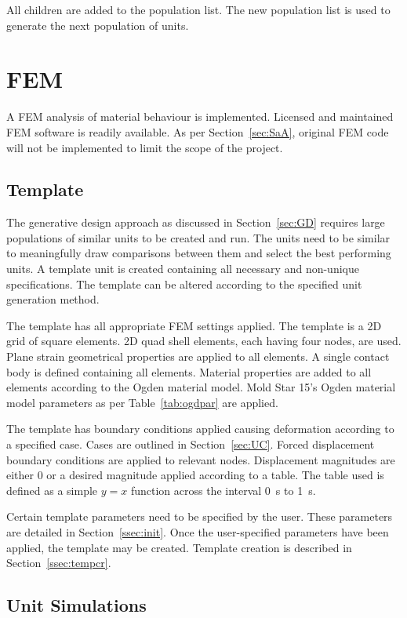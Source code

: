 All children are added to the population list. The new population list is used to generate the next population of units.

\section{FEM}

A FEM analysis of material behaviour is implemented. Licensed and maintained FEM software is readily available. As per Section~\ref{sec:SaA}, original FEM code will not be implemented to limit the scope of the project.

\subsection{Template}

The generative design approach as discussed in Section~\ref{sec:GD} requires large populations of similar units to be created and run. The units need to be similar to meaningfully draw comparisons between them and select the best performing units. A template unit is created containing all necessary and non-unique specifications. The template can be altered according to the specified unit generation method.

The template has all appropriate FEM settings applied. The template is a 2D grid of square elements. 2D quad shell elements, each having four nodes, are used. Plane strain geometrical properties are applied to all elements. A single contact body is defined containing all elements. Material properties are added to all elements according to the Ogden material model. Mold Star 15's Ogden material model parameters as per Table~\ref{tab:ogdpar} are applied.

The template has boundary conditions applied causing deformation according to a specified case. Cases are outlined in Section~\ref{sec:UC}. Forced displacement boundary conditions are applied to relevant nodes. Displacement magnitudes are either 0 or a desired magnitude applied according to a table. The table used is defined as a simple $y=x$ function across the interval \SI{0}{\second} to \SI{1}{\second}.

Certain template parameters need to be specified by the user. These parameters are detailed in Section~\ref{ssec:init}. Once the user-specified parameters have been applied, the template may be created. Template creation is described in Section~\ref{ssec:tempcr}.

\subsection{Unit Simulations}
\label{ssec:us}

